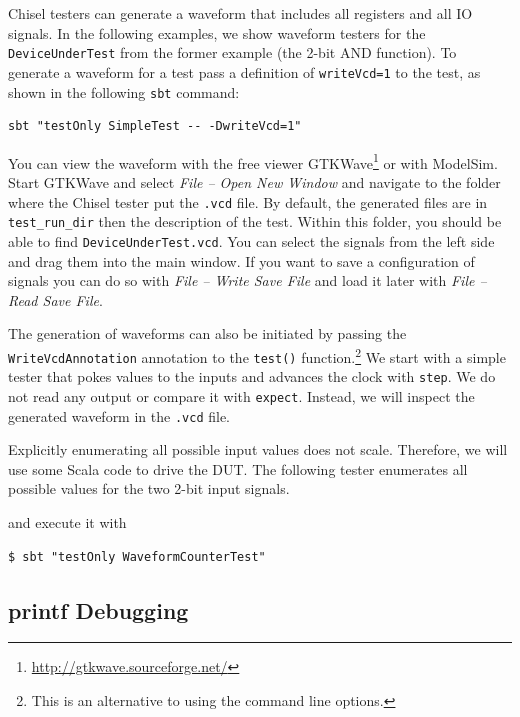 \documentclass[%
    10pt,
    headinclude, footexclude,
    openright, %
    notitlepage,
    cleardoubleempty,
    headsepline,
    pointlessnumbers,
    bibtotoc, idxtotoc,
    ]{scrbook}
\newcommand{\code}[1]{{\small{\texttt{#1}}}}
\newcommand{\myref}[2]{\href{#1}{#2}}
\renewcommand{\myref}[2]{{#2}{\footnote{\url{#1}}}}
\begin{document}
\noindent Chisel testers can generate a waveform that includes all registers and all
IO signals. In the following examples, we show waveform testers for the
\code{DeviceUnderTest} from the former example (the 2-bit AND function).
To generate a waveform for a test pass a definition of \code{writeVcd=1} to
the test, as shown in the following \code{sbt} command:

\begin{verbatim}
sbt "testOnly SimpleTest -- -DwriteVcd=1"
\end{verbatim}

You can view the waveform with the free viewer
\myref{http://gtkwave.sourceforge.net/}{GTKWave} or with ModelSim.
Start GTKWave and select \emph{File -- Open New Window} and navigate to the
folder where the Chisel tester put the \code{.vcd} file. By default, the generated files
are in \code{test\_run\_dir} then the description of the test. %
Within this folder, you should be able to find \code{DeviceUnderTest.vcd}.
You can select the signals from the left side and drag them into the main window.
If you want to save a configuration of signals you can do so with \emph{File -- Write Save File}
and load it later with \emph{File -- Read Save File}.

The generation of waveforms can also be initiated by passing the \code{WriteVcdAnnotation}
annotation to the \code{test()} function.\footnote{This is an alternative to
using the command line options.}
We start with a simple tester that pokes values to the inputs and advances
the clock with \code{step}. We do not read any output or compare it with \code{expect}.
Instead, we will inspect the generated waveform in the \code{.vcd} file.






Explicitly enumerating all possible input values does not scale. Therefore, we will use
some Scala code to drive the DUT. The following tester enumerates all possible values for
the two 2-bit input signals.


\noindent and execute it with

\begin{verbatim}
$ sbt "testOnly WaveformCounterTest"
\end{verbatim}

\subsection{printf Debugging}
\end{document}
